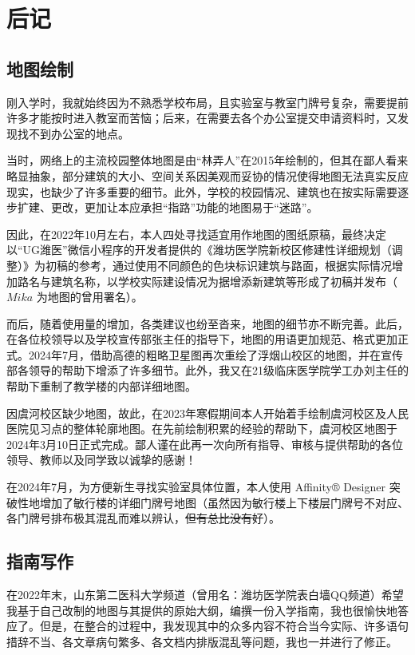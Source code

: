 \chapter[后记]{后记}
\section[地图绘制]{地图绘制}
刚入学时，我就始终因为不熟悉学校布局，且实验室与教室门牌号复杂，需要提前许多才能按时进入教室而苦恼；后来，在需要去各个办公室提交申请资料时，又发现找不到办公室的地点。

当时，网络上的主流校园整体地图是由“林弄人”在2015年绘制的，但其在鄙人看来略显抽象，部分建筑的大小、空间关系因美观而妥协的情况使得地图无法真实反应现实，也缺少了许多重要的细节。此外，学校的校园情况、建筑也在按实际需要逐步扩建、更改，更加让本应承担“指路”功能的地图易于“迷路”。

因此，在2022年10月左右，本人四处寻找适宜用作地图的图纸原稿，最终决定以“UG潍医”微信小程序的开发者提供的《潍坊医学院新校区修建性详细规划（调整）》为初稿的参考，通过使用不同颜色的色块标识建筑与路面，根据实际情况增加路名与建筑名称，以学校实际建设情况为据增添新建筑等形成了初稿并发布（$Mika$ 为地图的曾用署名）。

而后，随着使用量的增加，各类建议也纷至沓来，地图的细节亦不断完善。此后，在各位校领导以及学校宣传部张主任的指导下，地图的用语更加规范、格式更加正式。2024年7月，借助高德的粗略卫星图再次重绘了浮烟山校区的地图，并在宣传部各领导的帮助下增添了许多细节。此外，我又在21级临床医学院学工办刘主任的帮助下重制了教学楼的内部详细地图。

因虞河校区缺少地图，故此，在2023年寒假期间本人开始着手绘制虞河校区及人民医院见习点的整体轮廓地图。在先前绘制积累的经验的帮助下，虞河校区地图于2024年3月10日正式完成。鄙人谨在此再一次向所有指导、审核与提供帮助的各位领导、教师以及同学致以诚挚的感谢！

在2024年7月，为方便新生寻找实验室具体位置，本人使用 Affinity® Designer 突破性地增加了敏行楼的详细门牌号地图（虽然因为敏行楼上下楼层门牌号不对应、各门牌号排布极其混乱而难以辨认，\st{但有总比没有好}）。

\section[指南写作]{指南写作}

在2022年末，山东第二医科大学频道（曾用名：潍坊医学院表白墙QQ频道）希望我基于自己改制的地图与其提供的原始大纲，编撰一份入学指南，我也很愉快地答应了。但是，在整合的过程中，我发现其中的众多内容不符合当今实际、许多语句措辞不当、各文章病句繁多、各文档内排版混乱等问题，我也一并进行了修正。

